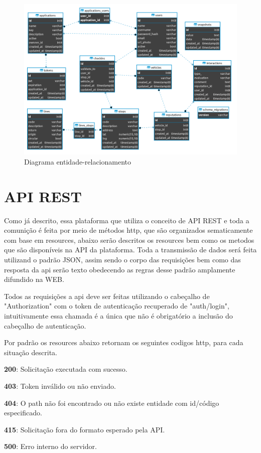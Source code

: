 \begin{figure}[H]
  \caption{\label{fig:uml_der}Diagrama entidade-relacionamento}
  \centering
  \includegraphics[scale=0.5]{imagens/diagramaer-sb.png}
\end{figure}

\section{API REST} \label{sec:modelagem:classe}

Como já descrito, essa plataforma que utiliza o conceito de API REST e toda a comunição é feita por meio 
de métodos http, que são organizados sematicamente com base em resources, abaixo serão descritos os resources
bem como os metodos que são disponíveis na API da plataforma. Toda a transmissão de dados será feita utilizand 
o padrão JSON, assim sendo o corpo das requisições bem como das resposta da api serão texto obedecendo as 
regras desse padrão amplamente difundido na WEB.  

Todos as requisições a api deve ser feitas utilizando o cabeçalho de "Authorization" com 
o token de autenticação recuperado de "auth/login", intuitivamente essa chamada é a única que 
não é obrigatório a inclusão do cabeçalho de autenticação. 

Por padrão os resources abaixo retornam os seguintes codigos http, para cada situação descrita.

\begin{lista}
  \item \textbf{200}: Solicitação executada com sucesso.
  \item \textbf{403}: Token inválido ou não enviado.
  \item \textbf{404}: O path não foi encontrado ou não existe entidade com id/código especificado.
  \item \textbf{415}: Solicitação fora do formato esperado pela API.
  \item \textbf{500}: Erro interno do servidor.
\end{lista}

